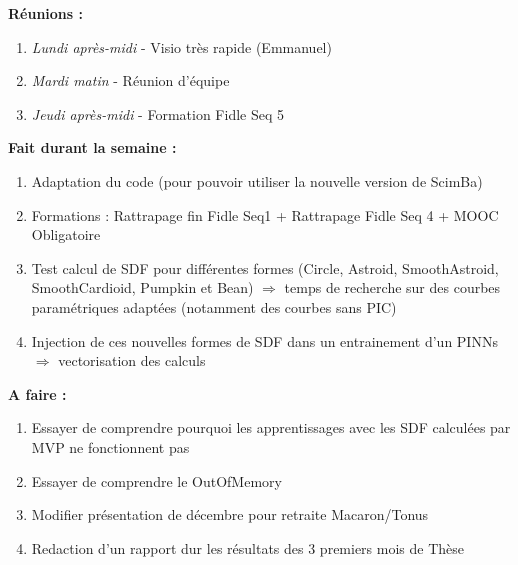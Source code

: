 \textbf{Réunions :}
\begin{enumerate}[label=\textbullet]
	\item \textit{Lundi après-midi} - Visio très rapide (Emmanuel)
	\item \textit{Mardi matin} - Réunion d'équipe
	\item \textit{Jeudi après-midi} - Formation Fidle Seq 5
\end{enumerate}
\textbf{Fait durant la semaine :}
\begin{enumerate}[label=\textbullet]
	\item Adaptation du code (pour pouvoir utiliser la nouvelle version de ScimBa)
	\item Formations : Rattrapage fin Fidle Seq1 + Rattrapage Fidle Seq 4 + MOOC Obligatoire
    \item Test calcul de SDF pour différentes formes (Circle, Astroid, SmoothAstroid, SmoothCardioid, Pumpkin et Bean) $\Rightarrow$ temps de recherche sur des courbes paramétriques adaptées (notamment des courbes sans PIC)
    \item Injection de ces nouvelles formes de SDF dans un entrainement d'un PINNs $\Rightarrow$ vectorisation des calculs
\end{enumerate}
\textbf{A faire :}
\begin{enumerate}[label=\textbullet]
	\item Essayer de comprendre pourquoi les apprentissages avec les SDF calculées par MVP ne fonctionnent pas
	\item Essayer de comprendre le OutOfMemory 
	\item Modifier présentation de décembre pour retraite Macaron/Tonus
	\item Redaction d'un rapport dur les résultats des 3 premiers mois de Thèse
\end{enumerate}